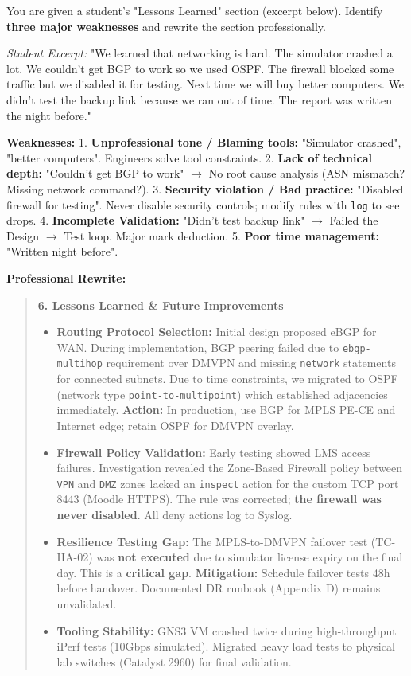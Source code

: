 \documentclass[11pt]{article}
\begin{document}
\begin{exercice}
You are given a student's "Lessons Learned" section (excerpt below). Identify \textbf{three major weaknesses} and rewrite the section professionally.

\textit{Student Excerpt:} "We learned that networking is hard. The simulator crashed a lot. We couldn't get BGP to work so we used OSPF. The firewall blocked some traffic but we disabled it for testing. Next time we will buy better computers. We didn't test the backup link because we ran out of time. The report was written the night before."
\end{exercice}

\begin{corrige}
\textbf{Weaknesses:}
1. \textbf{Unprofessional tone / Blaming tools:} "Simulator crashed", "better computers". Engineers solve tool constraints.
2. \textbf{Lack of technical depth:} "Couldn't get BGP to work" $\rightarrow$ No root cause analysis (ASN mismatch? Missing network command?).
3. \textbf{Security violation / Bad practice:} "Disabled firewall for testing". Never disable security controls; modify rules with \texttt{log} to see drops.
4. \textbf{Incomplete Validation:} "Didn't test backup link" $\rightarrow$ Failed the Design $\rightarrow$ Test loop. Major mark deduction.
5. \textbf{Poor time management:} "Written night before".

\textbf{Professional Rewrite:}
\begin{quote}
\textbf{6. Lessons Learned \& Future Improvements}
\begin{itemize}
    \item \textbf{Routing Protocol Selection:} Initial design proposed eBGP for WAN. During implementation, BGP peering failed due to \texttt{ebgp-multihop} requirement over DMVPN and missing \texttt{network} statements for connected subnets. Due to time constraints, we migrated to OSPF (network type \texttt{point-to-multipoint}) which established adjacencies immediately. \textbf{Action:} In production, use BGP for MPLS PE-CE and Internet edge; retain OSPF for DMVPN overlay.
    \item \textbf{Firewall Policy Validation:} Early testing showed LMS access failures. Investigation revealed the Zone-Based Firewall policy between \texttt{VPN} and \texttt{DMZ} zones lacked an \texttt{inspect} action for the custom TCP port 8443 (Moodle HTTPS). The rule was corrected; \textbf{the firewall was never disabled}. All deny actions log to Syslog.
    \item \textbf{Resilience Testing Gap:} The MPLS-to-DMVPN failover test (TC-HA-02) was \textbf{not executed} due to simulator license expiry on the final day. This is a \textbf{critical gap}. \textbf{Mitigation:} Schedule failover tests 48h before handover. Documented DR runbook (Appendix D) remains unvalidated.
    \item \textbf{Tooling Stability:} GNS3 VM crashed twice during high-throughput iPerf tests (10Gbps simulated). Migrated heavy load tests to physical lab switches (Catalyst 2960) for final validation.
\end{itemize}
\end{quote}
\end{corrige}
\end{document}
